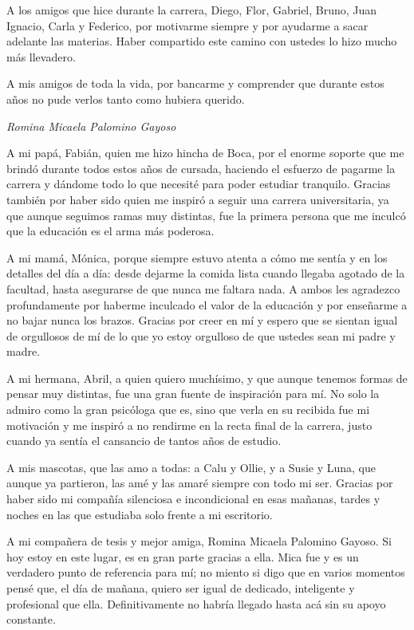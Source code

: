 A los amigos que hice durante la carrera, Diego, Flor, Gabriel, Bruno, Juan Ignacio, Carla y Federico, por motivarme siempre y por ayudarme a sacar adelante las materias. Haber compartido este camino con ustedes lo hizo mucho más llevadero.

A mis amigos de toda la vida, por bancarme y comprender que durante estos años no pude verlos tanto como hubiera querido.

\begin{flushright}\textit{Romina Micaela Palomino Gayoso}\end{flushright}

\bigskip

A mi papá, Fabián, quien me hizo hincha de Boca, por el enorme soporte que me brindó durante todos estos años de cursada, haciendo el esfuerzo de pagarme la carrera y dándome todo lo que necesité para poder estudiar tranquilo. Gracias también por haber sido quien me inspiró a seguir una carrera universitaria, ya que aunque seguimos ramas muy distintas, fue la primera persona que me inculcó que la educación es el arma más poderosa.

A mi mamá, Mónica, porque siempre estuvo atenta a cómo me sentía y en los detalles del día a día: desde dejarme la comida lista cuando llegaba agotado de la facultad, hasta asegurarse de que nunca me faltara nada. A ambos les agradezco profundamente por haberme inculcado el valor de la educación y por enseñarme a no bajar nunca los brazos. Gracias por creer en mí y espero que se sientan igual de orgullosos de mí de lo que yo estoy orgulloso de que ustedes sean mi padre y madre.

A mi hermana, Abril, a quien quiero muchísimo, y que aunque tenemos formas de pensar muy distintas, fue una gran fuente de inspiración para mí. No solo la admiro como la gran psicóloga que es, sino que verla en su recibida fue mi motivación y me inspiró a no rendirme en la recta final de la carrera, justo cuando ya sentía el cansancio de tantos años de estudio.

A mis mascotas, que las amo a todas: a Calu y Ollie, y a Susie y Luna, que aunque ya partieron, las amé y las amaré siempre con todo mi ser. Gracias por haber sido mi compañía silenciosa e incondicional en esas mañanas, tardes y noches en las que estudiaba solo frente a mi escritorio.

A mi compañera de tesis y mejor amiga, Romina Micaela Palomino Gayoso. Si hoy estoy en este lugar, es en gran parte gracias a ella. Mica fue y es un verdadero punto de referencia para mí; no miento si digo que en varios momentos pensé que, el día de mañana, quiero ser igual de dedicado, inteligente y profesional que ella. Definitivamente no habría llegado hasta acá sin su apoyo constante.

